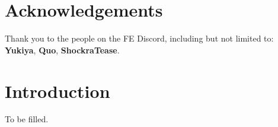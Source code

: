 \documentclass[a4paper]{report}
\begin{document}
\newcommand{\units}[1]{\item Select Units: \begin{itemize} #1 \end{itemize}}
\newcommand{\remove}[1]{\item Remove #1}
\newcommand{\add}[1]{\item Add #1}

\newcommand{\prep}[1]{\newline\newline Preparations: \begin{itemize} #1 \end{itemize}}

\newcommand{\support}[3]{\item Support #1 to #2, Rank #3}

\newcommand{\robinf}{\item \robin:}
\newcommand{\chromf}{\item \chrom:}
\newcommand{\frederickf}{\item \frederick:}
\newcommand{\lucinaf}{\item \lucina:}
\newcommand{\sullyf}{\item \sully:}
\newcommand{\rickenf}{\item \ricken:}
\newcommand{\cordeliaf}{\item \cordelia:}
\newcommand{\nowif}{\item \nowi:}
\newcommand{\oliviaf}{\item \olivia:}
\newcommand{\cherchef}{\item \cherche:}
\newcommand{\sayrif}{\item \sayri:}
\newcommand{\basiliof}{\item \basilio:}
\newcommand{\flaviaf}{\item \flavia:}


\setlength{\columnsep}{.5cm}

\section*{Acknowledgements}

Thank you to the people on the FE Discord, including but not limited to: \textbf{Yukiya}, \textbf{Quo}, \textbf{ShockraTease}.

\section*{Introduction}

To be filled.
\newpage
\end{document}
